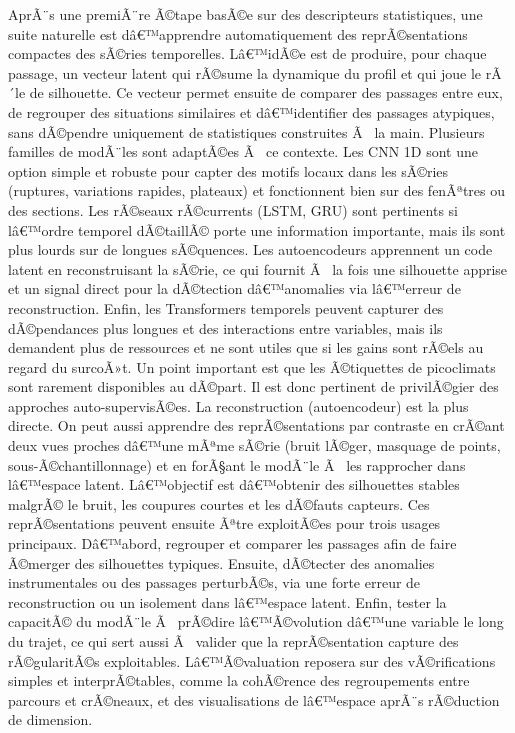 \documentclass{article}
\begin{document}
AprÃ¨s une premiÃ¨re Ã©tape basÃ©e sur des descripteurs statistiques, une suite naturelle est dâ€™apprendre automatiquement des reprÃ©sentations compactes des sÃ©ries temporelles. Lâ€™idÃ©e est de produire, pour chaque passage, un vecteur latent qui rÃ©sume la dynamique du profil et qui joue le rÃ´le de silhouette. Ce vecteur permet ensuite de comparer des passages entre eux, de regrouper des situations similaires et dâ€™identifier des passages atypiques, sans dÃ©pendre uniquement de statistiques construites Ã  la main.
Plusieurs familles de modÃ¨les sont adaptÃ©es Ã  ce contexte. Les CNN 1D sont une option simple et robuste pour capter des motifs locaux dans les sÃ©ries (ruptures, variations rapides, plateaux) et fonctionnent bien sur des fenÃªtres ou des sections. Les rÃ©seaux rÃ©currents (LSTM, GRU) sont pertinents si lâ€™ordre temporel dÃ©taillÃ© porte une information importante, mais ils sont plus lourds sur de longues sÃ©quences. Les autoencodeurs apprennent un code latent en reconstruisant la sÃ©rie, ce qui fournit Ã  la fois une silhouette apprise et un signal direct pour la dÃ©tection dâ€™anomalies via lâ€™erreur de reconstruction. Enfin, les Transformers temporels peuvent capturer des dÃ©pendances plus longues et des interactions entre variables, mais ils demandent plus de ressources et ne sont utiles que si les gains sont rÃ©els au regard du surcoÃ»t.
Un point important est que les Ã©tiquettes de picoclimats sont rarement disponibles au dÃ©part. Il est donc pertinent de privilÃ©gier des approches auto-supervisÃ©es. La reconstruction (autoencodeur) est la plus directe. On peut aussi apprendre des reprÃ©sentations par contraste en crÃ©ant deux vues proches dâ€™une mÃªme sÃ©rie (bruit lÃ©ger, masquage de points, sous-Ã©chantillonnage) et en forÃ§ant le modÃ¨le Ã  les rapprocher dans lâ€™espace latent. Lâ€™objectif est dâ€™obtenir des silhouettes stables malgrÃ© le bruit, les coupures courtes et les dÃ©fauts capteurs.
Ces reprÃ©sentations peuvent ensuite Ãªtre exploitÃ©es pour trois usages principaux. Dâ€™abord, regrouper et comparer les passages afin de faire Ã©merger des silhouettes typiques. Ensuite, dÃ©tecter des anomalies instrumentales ou des passages perturbÃ©s, via une forte erreur de reconstruction ou un isolement dans lâ€™espace latent. Enfin, tester la capacitÃ© du modÃ¨le Ã  prÃ©dire lâ€™Ã©volution dâ€™une variable le long du trajet, ce qui sert aussi Ã  valider que la reprÃ©sentation capture des rÃ©gularitÃ©s exploitables. Lâ€™Ã©valuation reposera sur des vÃ©rifications simples et interprÃ©tables, comme la cohÃ©rence des regroupements entre parcours et crÃ©neaux, et des visualisations de lâ€™espace aprÃ¨s rÃ©duction de dimension.
\end{document}
